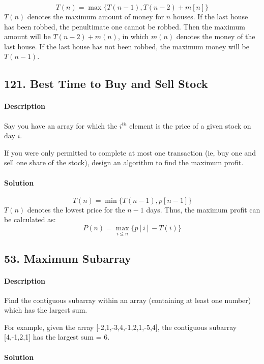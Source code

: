 $$T(n)=\max\{T(n-1),T(n-2)+m[n]\}$$
$T(n)$ denotes the maximum amount of money for $n$ houses. If the last house has been robbed, the penultimate one cannot be robbed. Then the maximum amount will be $T(n-2)+m(n)$, in which $m(n)$ denotes the money of the last house. If the last house has not been robbed, the maximum money will be $T(n-1)$.

\subsection{121. Best Time to Buy and Sell Stock}

\paragraph{Description}

Say you have an array for which the $i^{th}$ element is the price of a given stock on day $i$.

If you were only permitted to complete at most one transaction (ie, buy one and sell one share of the stock), design an algorithm to find the maximum profit.

\paragraph{Solution}

$$T(n)=\min\{T(n-1),p[n-1]\}$$
$T(n)$ denotes the lowest price for the $n-1$ days. Thus, the maximum profit can be calculated as:
$$P(n)=\max_{i\leqslant n}\{p[i]-T(i)\}$$

\subsection{53. Maximum Subarray}

\paragraph{Description}

Find the contiguous subarray within an array (containing at least one number) which has the largest sum.

For example, given the array [-2,1,-3,4,-1,2,1,-5,4],
the contiguous subarray [4,-1,2,1] has the largest sum = 6.

\paragraph{Solution}

